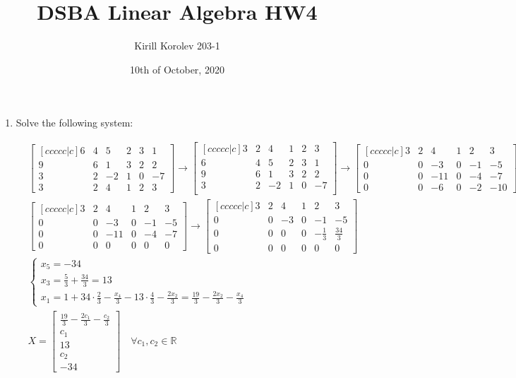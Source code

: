 \documentclass{article}
\title{DSBA Linear Algebra HW4}
\author{Kirill Korolev 203-1}
\date{10th of October, 2020}
\begin{document}
\maketitle

\begin{enumerate}

\item Solve the following system:

\begin{align*}
&\begin{bmatrix}[ccccc|c]
6 & 4 & 5 & 2 & 3 & 1\\
9 & 6 & 1 & 3 & 2 & 2\\
3 & 2 & -2 & 1 & 0 & -7\\
3 & 2 & 4 & 1 & 2 & 3
\end{bmatrix}
\to
\begin{bmatrix}[ccccc|c]
3 & 2 & 4 & 1 & 2 & 3\\
6 & 4 & 5 & 2 & 3 & 1\\
9 & 6 & 1 & 3 & 2 & 2\\
3 & 2 & -2 & 1 & 0 & -7\\
\end{bmatrix}
\to
\begin{bmatrix}[ccccc|c]
3 & 2 & 4 & 1 & 2 & 3\\
0 & 0 & -3 & 0 & -1 & -5\\
0 & 0 & -11 & 0 & -4 & -7\\
0 & 0 & -6 & 0 & -2 & -10
\end{bmatrix}
\to\\
&\begin{bmatrix}[ccccc|c]
3 & 2 & 4 & 1 & 2 & 3\\
0 & 0 & -3 & 0 & -1 & -5\\
0 & 0 & -11 & 0 & -4 & -7\\
0 & 0 & 0 & 0 & 0 & 0
\end{bmatrix}
\to
\begin{bmatrix}[ccccc|c]
3 & 2 & 4 & 1 & 2 & 3\\
0 & 0 & -3 & 0 & -1 & -5\\
0 & 0 & 0 & 0 & -\frac{1}{3} & \frac{34}{3}\\
0 & 0 & 0 & 0 & 0 & 0
\end{bmatrix}\\
&\begin{cases}
x_5 = -34\\
x_3 = \frac{5}{3} + \frac{34}{3} = 13\\
x_1 = 1 + 34 \cdot \frac{2}{3} - \frac{x_4}{3} - 13 \cdot \frac{4}{3} - \frac{2x_2}{3} = \frac{19}{3} - \frac{2x_2}{3} - \frac{x_4}{3}
\end{cases}\\
&X = \begin{bmatrix}
\frac{19}{3} - \frac{2c_1}{3} - \frac{c_2}{3}\\c_1\\13\\c_2\\-34
\end{bmatrix} \quad \forall c_1, c_2 \in \mathbb{R}
\end{align*}


\end{enumerate}
\end{document}
